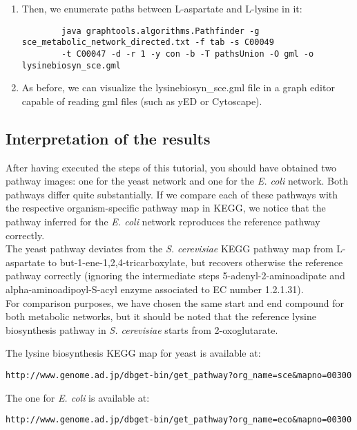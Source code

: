 \begin{enumerate}
\item Then, we enumerate paths between L-aspartate and L-lysine in it:

		{\color{Blue} \begin{footnotesize}
		\begin{verbatim}
		java graphtools.algorithms.Pathfinder -g sce_metabolic_network_directed.txt -f tab -s C00049
		-t C00047 -d -r 1 -y con -b -T pathsUnion -O gml -o lysinebiosyn_sce.gml
		\end{verbatim} \end{footnotesize}
		}

\item As before, we can visualize the lysinebiosyn\_sce.gml file in a graph editor capable of reading gml files
     (such as yED or Cytoscape).

\end{enumerate}

\subsection{Interpretation of the results}

After having executed the steps of this tutorial, you should have obtained two pathway images:
one for the yeast network and one for the \textit{E. coli} network. Both pathways differ quite substantially.
If we compare each of these pathways with the respective organism-specific pathway map in KEGG, we notice that
the pathway inferred for the \textit{E. coli} network reproduces the reference pathway correctly.\\
The yeast pathway deviates from the \textit{S. cerevisiae} KEGG pathway map from L-aspartate to but-1-ene-1,2,4-tricarboxylate,
but recovers otherwise the reference pathway correctly (ignoring the intermediate steps 5-adenyl-2-aminoadipate and
alpha-aminoadipoyl-S-acyl enzyme associated to EC number 1.2.1.31). \\
For comparison purposes, we have chosen the same start and end compound for both metabolic networks, but it should
be noted that the reference lysine biosynthesis pathway in \textit{S. cerevisiae} starts from 2-oxoglutarate.

The lysine biosynthesis KEGG map for yeast is available at:
\begin{verbatim}
http://www.genome.ad.jp/dbget-bin/get_pathway?org_name=sce&mapno=00300
\end{verbatim}

The one for \textit{E. coli} is available at:
\begin{verbatim}
http://www.genome.ad.jp/dbget-bin/get_pathway?org_name=eco&mapno=00300
\end{verbatim}


